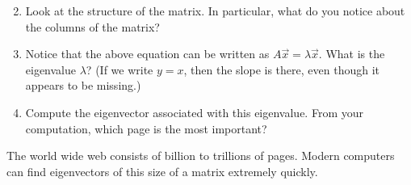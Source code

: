 \begin{problem}
\begin{enumerate}
$$$$
\item Look at the structure of the matrix.  In particular, what do you notice about the columns of the matrix?
\item Notice that the above equation can be written as $A\vec x = \lambda \vec x$. What is the eigenvalue $\lambda$? (If we write $y=x$, then the slope is there, even though it appears to be missing.)
\item Compute the eigenvector associated with this eigenvalue.  From your computation, which page is the most important?
\end{enumerate}
The world wide web consists of billion to trillions of pages. Modern computers can find eigenvectors of this size of a matrix extremely quickly.  
\end{problem}
















